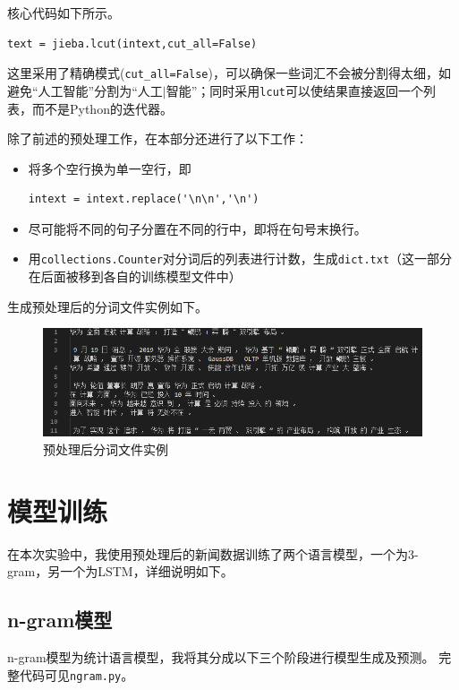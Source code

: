 \documentclass[logo,reportComp]{thesis}
\begin{document}
核心代码如下所示。
\begin{lstlisting}
text = jieba.lcut(intext,cut_all=False)
\end{lstlisting}
这里采用了精确模式(\verb'cut_all=False')，可以确保一些词汇不会被分割得太细，如避免``人工智能''分割为``人工$\mid$智能''；同时采用\verb'lcut'可以使结果直接返回一个列表，而不是Python的迭代器。

除了前述的预处理工作，在本部分还进行了以下工作：
\begin{itemize}
\item 将多个空行换为单一空行，即
\begin{lstlisting}
intext = intext.replace('\n\n','\n')
\end{lstlisting}
\item 尽可能将不同的句子分置在不同的行中，即将在句号末换行。
\item 用\verb'collections.Counter'对分词后的列表进行计数，生成\verb'dict.txt'（这一部分在后面被移到各自的训练模型文件中）
\end{itemize}

生成预处理后的分词文件实例如下。
\begin{figure}[H]
\centering
\includegraphics[width=\linewidth]{fig/jieba.png}
\caption{预处理后分词文件实例}
\end{figure}


\section{模型训练}

在本次实验中，我使用预处理后的新闻数据训练了两个语言模型，一个为3-gram，另一个为LSTM，详细说明如下。

\subsection{n-gram模型}
n-gram模型为统计语言模型，我将其分成以下三个阶段进行模型生成及预测。
完整代码可见\verb'ngram.py'。
\end{document}
